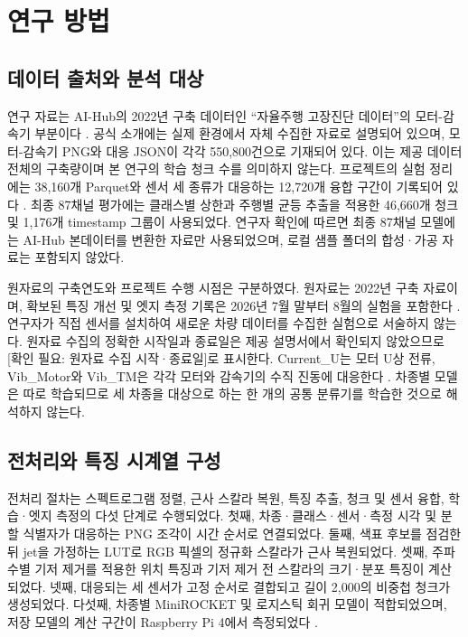 \documentclass[11pt,a4paper]{article}
\newcommand{\checkneeded}[1]{\textcolor{red!65!black}{[확인 필요: #1]}}
\newcommand{\sourceproject}{\citep{project2026}}
\newcommand{\smalltable}[1]{\begingroup\small\setlength{\tabcolsep}{5pt}\endgroup}
\begin{document}
\section{연구 방법}
\subsection{데이터 출처와 분석 대상}
연구 자료는 AI-Hub의 2022년 구축 데이터인 ``자율주행 고장진단 데이터''의 모터-감속기 부분이다 \citep{aihub2022}.
공식 소개에는 실제 환경에서 자체 수집한 자료로 설명되어 있으며, 모터-감속기 PNG와 대응 JSON이 각각 550,800건으로 기재되어 있다.
이는 제공 데이터 전체의 구축량이며 본 연구의 학습 청크 수를 의미하지 않는다.
프로젝트의 실험 정리에는 38,160개 Parquet와 센서 세 종류가 대응하는 12,720개 융합 구간이 기록되어 있다 \sourceproject.
최종 87채널 평가에는 클래스별 상한과 주행별 균등 추출을 적용한 46,660개 청크 및 1,176개 timestamp 그룹이 사용되었다.
연구자 확인에 따르면 최종 87채널 모델에는 AI-Hub 본데이터를 변환한 자료만 사용되었으며, 로컬 샘플 폴더의 합성·가공 자료는 포함되지 않았다.

원자료의 구축연도와 프로젝트 수행 시점은 구분하였다.
원자료는 2022년 구축 자료이며, 확보된 특징 개선 및 엣지 측정 기록은 2026년 7월 말부터 8월의 실험을 포함한다 \sourceproject.
연구자가 직접 센서를 설치하여 새로운 차량 데이터를 수집한 실험으로 서술하지 않는다.
원자료 수집의 정확한 시작일과 종료일은 제공 설명서에서 확인되지 않았으므로 \checkneeded{원자료 수집 시작·종료일}로 표시한다.
Current\_U는 모터 U상 전류, Vib\_Motor와 Vib\_TM은 각각 모터와 감속기의 수직 진동에 대응한다 \citep{aihub2022}.
차종별 모델은 따로 학습되므로 세 차종을 대상으로 하는 한 개의 공통 분류기를 학습한 것으로 해석하지 않는다.

\begin{table}[htbp]
\centering
\caption{최종 87채널 평가에 사용된 청크 및 timestamp 그룹 수. 클래스별 열은 청크 수가 아닌 주행 그룹 수이다.}
\label{tab:samples}
\smalltable{samples.tex}
\end{table}

\subsection{전처리와 특징 시계열 구성}
전처리 절차는 스펙트로그램 정렬, 근사 스칼라 복원, 특징 추출, 청크 및 센서 융합, 학습·엣지 측정의 다섯 단계로 수행되었다.
첫째, 차종·클래스·센서·측정 시각 및 분할 식별자가 대응하는 PNG 조각이 시간 순서로 연결되었다.
둘째, 색표 후보를 점검한 뒤 jet을 가정하는 LUT로 RGB 픽셀의 정규화 스칼라가 근사 복원되었다.
셋째, 주파수별 기저 제거를 적용한 위치 특징과 기저 제거 전 스칼라의 크기·분포 특징이 계산되었다.
넷째, 대응되는 세 센서가 고정 순서로 결합되고 길이 2,000의 비중첩 청크가 생성되었다.
다섯째, 차종별 MiniROCKET 및 로지스틱 회귀 모델이 적합되었으며, 저장 모델의 계산 구간이 Raspberry Pi 4에서 측정되었다 \sourceproject.
\end{document}
